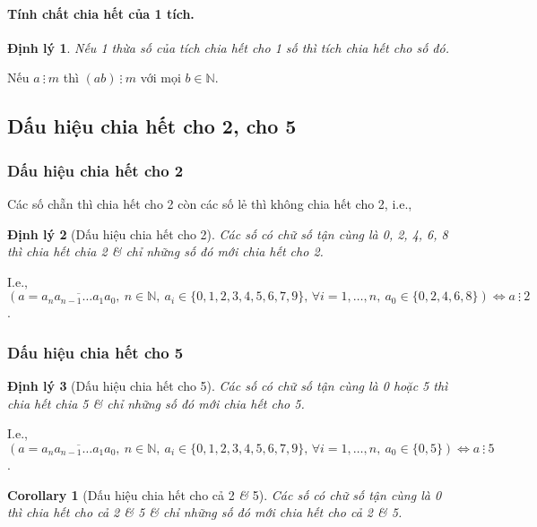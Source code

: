 \documentclass{article}
\numberwithin{equation}{section}
\newtheorem{corollary}{Corollary}[section]
\newtheorem{theorem}{Định lý}[section]
\begin{document}
\paragraph{Tính chất chia hết của 1 tích.}
\begin{theorem}
	Nếu 1 thừa số của tích chia hết cho 1 số thì tích chia hết cho số đó.
\end{theorem}
Nếu $a\ \vdots\ m$  thì $(ab)\ \vdots\ m$ với mọi $b\in\mathbb{N}$.

\subsection{Dấu hiệu chia hết cho 2, cho 5}

\subsubsection{Dấu hiệu chia hết cho 2}
Các số chẵn thì chia hết cho 2 còn các số lẻ thì không chia hết cho 2, i.e.,

\begin{theorem}[Dấu hiệu chia hết cho 2]
	Các số có chữ số tận cùng là 0, 2, 4, 6, 8 thì chia hết chia 2 \textit{\&} chỉ những số đó mới chia hết cho 2.
\end{theorem}
I.e., $(a = \overline{a_na_{n-1}\ldots a_1a_0},\ n\in\mathbb{N},\ a_i\in\{0,1,2,3,4,5,6,7,9\},\,\forall i = 1,\ldots,n,\ a_0\in\{0,2,4,6,8\})\Leftrightarrow a\ \vdots\ 2$.

\subsubsection{Dấu hiệu chia hết cho 5}
\begin{theorem}[Dấu hiệu chia hết cho 5]
	Các số có chữ số tận cùng là 0 hoặc 5 thì chia hết chia 5 \textit{\&} chỉ những số đó mới chia hết cho 5.
\end{theorem}
I.e., $(a = \overline{a_na_{n-1}\ldots a_1a_0},\ n\in\mathbb{N},\ a_i\in\{0,1,2,3,4,5,6,7,9\},\,\forall i = 1,\ldots,n,\ a_0\in\{0,5\})\Leftrightarrow a\ \vdots\ 5$.

\begin{corollary}[Dấu hiệu chia hết cho cả 2 \textit{\&} 5]
	Các số có chữ số tận cùng là 0 thì chia hết cho cả 2 \textit{\&} 5 \textit{\&} chỉ những số đó mới chia hết cho cả 2 \textit{\&} 5.
\end{corollary}
\end{document}
